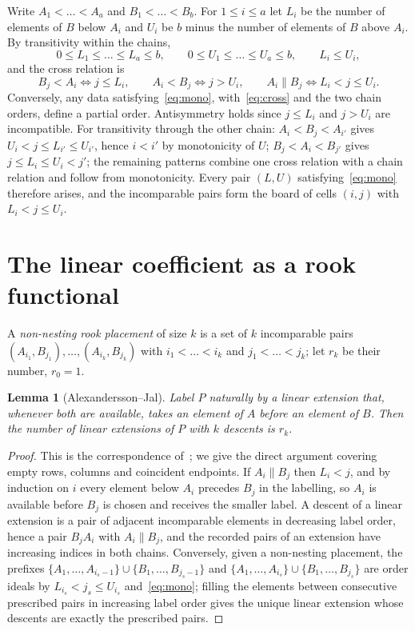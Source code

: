 \documentclass[11pt]{article}
\newtheorem{lemma}[theorem]{Lemma}
\theoremstyle{definition}
\theoremstyle{remark}
\begin{document}
Write $A_1<\dots<A_a$ and $B_1<\dots<B_b$. For $1\le i\le a$ let $L_i$ be
the number of elements of $B$ below $A_i$ and $U_i$ be $b$ minus the
number of elements of $B$ above $A_i$. By transitivity within the chains,
\begin{equation}\label{eq:mono}
0\le L_1\le\dots\le L_a\le b,\qquad 0\le U_1\le\dots\le U_a\le b,\qquad
L_i\le U_i,
\end{equation}
and the cross relation is
\begin{equation}\label{eq:cross}
B_j<A_i\iff j\le L_i,\qquad A_i<B_j\iff j>U_i,\qquad A_i\parallel
B_j\iff L_i<j\le U_i.
\end{equation}
Conversely, any data satisfying~\eqref{eq:mono}, with~\eqref{eq:cross}
and the two chain orders, define a partial order. Antisymmetry holds since
$j\le L_i$ and $j>U_i$ are incompatible. For transitivity through the
other chain: $A_i<B_j<A_{i'}$ gives $U_i<j\le L_{i'}\le U_{i'}$, hence
$i<i'$ by monotonicity of $U$; $B_j<A_i<B_{j'}$ gives $j\le L_i\le U_i<j'$;
the remaining patterns combine one cross relation with a chain relation
and follow from monotonicity. Every pair $(L,U)$ satisfying~\eqref{eq:mono}
therefore arises, and the incomparable pairs form the board of cells
$(i,j)$ with $L_i<j\le U_i$.

\section{The linear coefficient as a rook functional}\label{sec:lin}

A \emph{non-nesting rook placement} of size $k$ is a set of $k$
incomparable pairs $(A_{i_1},B_{j_1}),\dots,(A_{i_k},B_{j_k})$ with
$i_1<\dots<i_k$ and $j_1<\dots<j_k$; let $r_k$ be their number, $r_0=1$.

\begin{lemma}[Alexandersson--Jal]\label{lem:rook}
Label $P$ naturally by a linear extension that, whenever both are
available, takes an element of $A$ before an element of $B$. Then the
number of linear extensions of $P$ with $k$ descents is $r_k$.
\end{lemma}

\begin{proof}
This is the correspondence of~\cite[Theorem~5.4, Lemma~5.6,
Corollary~5.8]{AJ}; we give the direct argument covering empty rows,
columns and coincident endpoints. If $A_i\parallel B_j$ then
$L_i<j$, and by induction on $i$ every element below $A_i$ precedes $B_j$
in the labelling, so
$A_i$ is available before $B_j$ is chosen and receives the smaller
label. A descent of a linear extension is a pair of adjacent incomparable
elements in decreasing label order, hence a pair $B_jA_i$ with
$A_i\parallel B_j$, and the recorded pairs of an extension have
increasing indices in both chains. Conversely, given a non-nesting
placement, the prefixes $\{A_1,\dots,A_{i_s-1}\}\cup\{B_1,\dots,B_{j_s-1}\}$
and $\{A_1,\dots,A_{i_s}\}\cup\{B_1,\dots,B_{j_s}\}$ are order ideals by
$L_{i_s}<j_s\le U_{i_s}$ and~\eqref{eq:mono}; filling the elements between
consecutive prescribed pairs in increasing label order gives the unique
linear extension whose descents are exactly the prescribed pairs.
\end{proof}
\end{document}

